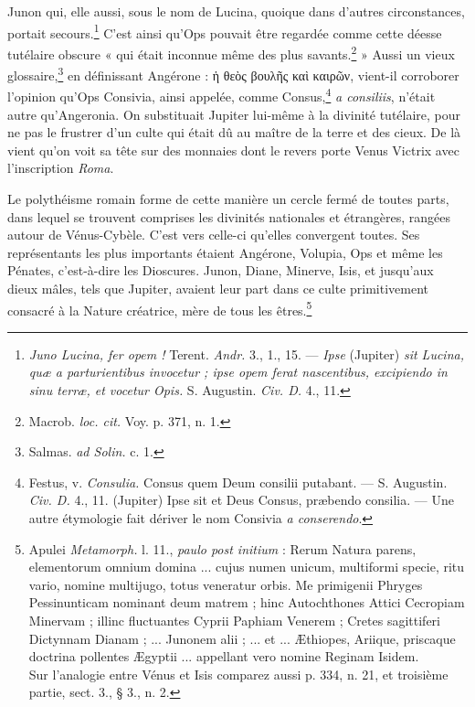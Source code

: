 \documentclass[a4paper, 11pt, oneside, polutonikogreek, french]{article}
\begin{document}
Junon qui, elle aussi, sous le nom de Lucina, quoique dans d'autres circonstances, portait secours.\footnote{\emph{Juno Lucina, fer opem !} Terent. \emph{Andr.} 3., 1., 15. --- \emph{Ipse} (Jupiter) \emph{sit Lucina, quæ a parturientibus invocetur ; ipse opem ferat nascentibus, excipiendo in sinu terræ, et vocetur Opis.} S. Augustin. \emph{Civ. D.} 4., 11.} C'est ainsi qu'Ops pouvait être regardée comme cette déesse tutélaire obscure « qui était inconnue même des plus savants.\footnote{Macrob. \emph{loc. cit.} Voy. p. 371, n. 1.} » Aussi un vieux glossaire,\footnote{Salmas. \emph{ad Solin.} c. 1.} en définissant Angérone : ἡ θεὸς βουλῆς καὶ καιρῶν, vient-il corroborer l'opinion qu'Ops Consivia, ainsi appelée, comme Consus,\footnote{Festus, v. \emph{Consulia.} Consus quem Deum consilii putabant. --- S. Augustin. \emph{Civ. D.} 4., 11. (Jupiter) Ipse sit et Deus Consus, præbendo consilia. --- Une autre étymologie fait dériver le nom Consivia \emph{a conserendo}.} \emph{a consiliis}, n'était autre qu'Angeronia. On substituait Jupiter lui-même à la divinité tutélaire, pour ne pas le frustrer d'un culte qui était dû au maître de la terre et des cieux. De là vient qu'on voit sa tête sur des monnaies dont le revers porte Venus Victrix avec l'inscription \emph{Roma}.

Le polythéisme romain forme de cette manière un cercle fermé de toutes parts, dans lequel se trouvent comprises les divinités nationales et étrangères, rangées autour de Vénus-Cybèle. C'est vers celle-ci qu'elles convergent toutes. Ses représentants les plus importants étaient Angérone, Volupia, Ops et même les Pénates, c'est-à-dire les Dioscures. Junon, Diane, Minerve, Isis, et jusqu'aux dieux mâles, tels que Jupiter, avaient leur part dans ce culte primitivement consacré à la Nature créatrice, mère de tous les êtres.\footnote{Apulei \emph{Metamorph.} l. 11., \emph{paulo post initium} : Rerum Natura parens, elementorum omnium domina ... cujus numen unicum, multiformi specie, ritu vario, nomine multijugo, totus veneratur orbis. Me primigenii Phryges Pessinunticam nominant deum matrem ; hinc Autochthones Attici Cecropiam Minervam ; illinc fluctuantes Cyprii Paphiam Venerem ; Cretes sagittiferi Dictynnam Dianam ; ... Junonem alii ; ... et ... Æthiopes, Ariique, priscaque doctrina pollentes Ægyptii ... appellant vero nomine Reginam Isidem.\\\hspace*{5mm}Sur l'analogie entre Vénus et Isis comparez aussi p. 334, n. 21, et troisième partie, sect. 3., § 3., n. 2.}
\end{document}
